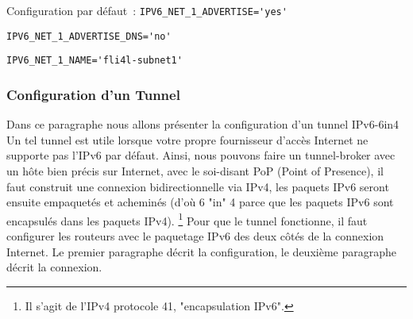 \begin{description}
{Configuration par défaut~:
}
\verb*?IPV6_NET_1_ADVERTISE='yes'?

\verb*?IPV6_NET_1_ADVERTISE_DNS='no'?

\verb*?IPV6_NET_1_NAME='fli4l-subnet1'?

\end{description}

\subsubsection{Configuration d'un Tunnel}

Dans ce paragraphe nous allons présenter la configuration d'un tunnel IPv6-6in4
Un tel tunnel est utile lorsque votre propre fournisseur d'accès Internet ne
supporte pas l'IPv6 par défaut. Ainsi, nous pouvons faire un tunnel-broker avec
un hôte bien précis sur Internet, avec le soi-disant PoP (Point of Presence), il
faut construit une connexion bidirectionnelle via IPv4, les paquets IPv6 seront
ensuite empaquetés et acheminés (d'où 6 "in" 4 parce que les paquets IPv6 sont
encapsulés dans les paquets IPv4). \footnote{Il s'agit de l'IPv4 protocole 41,
"encapsulation IPv6".} Pour que le tunnel fonctionne, il faut configurer les
routeurs avec le paquetage IPv6 des deux côtés de la connexion Internet. Le
premier paragraphe décrit la configuration, le deuxième paragraphe décrit la
connexion.


